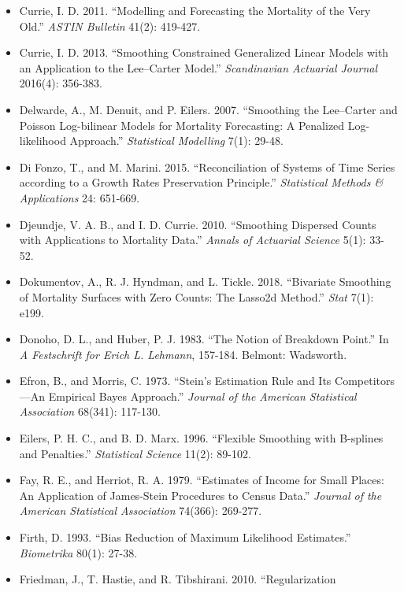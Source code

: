 \documentclass[UTF8, fontset=macnew, a4paper, 12pt]{ctexart}
\begin{document}
\begin{itemize}[leftmargin=2em, label={}, itemsep=3pt]
        4(4): 279-298.
  \item[] Currie, I. D. 2011. ``Modelling and Forecasting the Mortality of the
        Very Old.'' \textit{ASTIN Bulletin} 41(2): 419-427.
  \item[] Currie, I. D. 2013. ``Smoothing Constrained Generalized Linear Models
        with an Application to the Lee--Carter Model.''
        \textit{Scandinavian Actuarial Journal} 2016(4): 356-383.
  \item[] Delwarde, A., M. Denuit, and P. Eilers. 2007. ``Smoothing the
        Lee--Carter and Poisson Log-bilinear Models for Mortality Forecasting:
        A Penalized Log-likelihood Approach.''
        \textit{Statistical Modelling} 7(1): 29-48.
  \item[] Di Fonzo, T., and M. Marini. 2015. ``Reconciliation of Systems of
        Time Series according to a Growth Rates Preservation Principle.''
        \textit{Statistical Methods \& Applications} 24: 651-669.
  \item[] Djeundje, V. A. B., and I. D. Currie. 2010. ``Smoothing Dispersed
        Counts with Applications to Mortality Data.''
        \textit{Annals of Actuarial Science} 5(1): 33-52.
  \item[] Dokumentov, A., R. J. Hyndman, and L. Tickle. 2018. ``Bivariate
        Smoothing of Mortality Surfaces with Zero Counts: The Lasso2d Method.''
        \textit{Stat} 7(1): e199.
  \item[] Donoho, D. L., and Huber, P. J. 1983. ``The Notion of Breakdown Point.''
        In \textit{A Festschrift for Erich L. Lehmann}, 157-184. Belmont: Wadsworth.
  \item[] Efron, B., and Morris, C. 1973. ``Stein's Estimation Rule and Its
        Competitors---An Empirical Bayes Approach.''
        \textit{Journal of the American Statistical Association} 68(341): 117-130.
  \item[] Eilers, P. H. C., and B. D. Marx. 1996. ``Flexible Smoothing with
        B-splines and Penalties.'' \textit{Statistical Science} 11(2): 89-102.
  \item[] Fay, R. E., and Herriot, R. A. 1979. ``Estimates of Income for Small Places:
        An Application of James-Stein Procedures to Census Data.''
        \textit{Journal of the American Statistical Association} 74(366): 269-277.
  \item[] Firth, D. 1993. ``Bias Reduction of Maximum Likelihood Estimates.''
        \textit{Biometrika} 80(1): 27-38.
  \item[] Friedman, J., T. Hastie, and R. Tibshirani. 2010. ``Regularization

\end{itemize}
\end{document}
